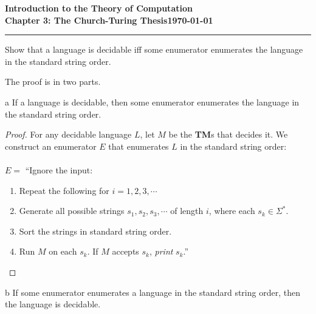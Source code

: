 \documentclass[11pt]{article}
\newcommand{\dated}{\today}
\begin{document}
\textbf{Introduction to the Theory of
Computation}\hfill\textbf{\myname}\\[0.01in]
\textbf{Chapter 3: The Church-Turing Thesis}\hfill\textbf{\dated}\\
\smallskip\hrule\bigskip

\begin{problem}{3.18}
Show that a language is decidable iff some enumerator enumerates the language in the standard string order.
\end{problem}

The proof is in two parts.

\begin{problem}[Part]{a}
If a language is decidable, then some enumerator enumerates the language in
the standard string order.
\end{problem}

\begin{proof}
For any decidable language $L$, let $M$ be the \textbf{TM}s that decides it. We construct an enumerator $E$ that enumerates $L$ in the standard string order: \\
\\
$E = $ \textquotedblleft Ignore the input:
\begin{enumerate}
\item Repeat the following for $i = 1,2,3, \cdots$
\item \hspace*{0.5cm} Generate all possible strings $s_1,s_2,s_3,\cdots$ of length $i$, where each $s_k \in \Sigma^{*}$.
\item \hspace*{0.5cm} Sort the strings in standard string order.
\item \hspace*{0.5cm} Run $M$ on each $s_k$. If $M$ accepts $s_k$, \textit{print} $s_k$.\textquotedblright
\end{enumerate}

\end{proof}

\begin{problem}[Part]{b}
If some enumerator enumerates a language in the standard string order, then the language is decidable.
\end{problem}
\end{document}

